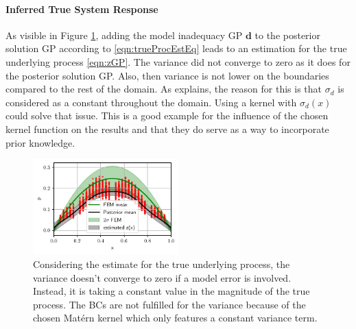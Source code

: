 \documentclass[%
  a4paper,oneside,%
  11pt,%
  smallchapters,
  style=printdev,
  extramargin,
  green,%
  rgb, <cmyk>
  ]{tubsbook}
\begin{document}
\paragraph{Inferred True System Response}
As visible in Figure \ref{fig:Trueproc1D}, adding the model inadequacy GP $\bm{d}$ to the posterior solution GP according to \eqref{eqn:trueProcEstEq} leads to an estimation for the true underlying process \eqref{eqn:zGP}.
The variance did not converge to zero as it does for the posterior solution GP. Also, then variance is not lower on the boundaries compared to the rest of the domain. As \cite{girolami2021} explains, the reason for this is that $\sigma_d$ is considered as a constant throughout the domain. Using a kernel with $\sigma_d(x)$ could solve that issue. This is a good example for the influence of the chosen kernel function on the results and that they do serve as a way to incorporate prior knowledge.
\begin{figure}[!ht]
\includegraphics[width=0.5\textwidth]{../../Python/Results/1D/Model_Error/100o_30s/ResultZ.pdf}
\centering
\caption[Estimating the true process for the 1D example]{Considering the estimate for the true underlying process, the variance doesn't converge to zero if a model error is involved. Instead, it is taking a constant value in the magnitude of the true process. The BCs are not fulfilled for the variance because of the chosen Mat\'ern kernel which only features a constant variance term.}
\label{fig:Trueproc1D}
\end{figure}




\FloatBarrier
\end{document}

